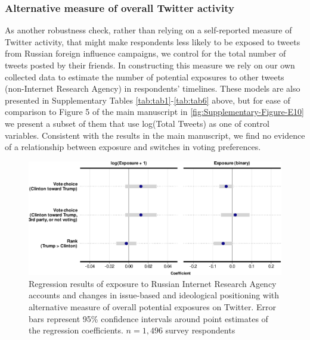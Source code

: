 \documentclass[
  12pt,
]{article}
\begin{document}
\clearpage

\hypertarget{alternative-measure-of-overall-twitter-activity}{%
\subsubsection{Alternative measure of overall Twitter activity}\label{alternative-measure-of-overall-twitter-activity}}

As another robustness check, rather than relying on a self-reported measure of Twitter activity, that might make respondents less likely to be exposed to tweets from Russian foreign influence campaigns, we control for the total number of tweets posted by their friends. In constructing this measure we rely on our own collected data to estimate the number of potential exposures to other tweets (non-Internet Research Agency) in respondents' timelines. These models are also presented in Supplementary Tables \ref{tab:tab1}-\ref{tab:tab6} above, but for ease of comparison to Figure 5 of the main manuscript in \autoref{fig:Supplementary-Figure-E10} we present a subset of them that use log(Total Tweets) as one of control variables. Consistent with the results in the main manuscript, we find no evidence of a relationship between exposure and switches in voting preferences.

\begin{figure}
\centering
\includegraphics{Supplementary_Information_files/figure-latex/Supplementary-Figure-E10-1.pdf}
\caption{\label{fig:Supplementary-Figure-E10}Regression results of exposure to Russian Internet Research Agency accounts and changes in issue-based and ideological positioning with alternative measure of overall potential exposures on Twitter. Error bars represent 95\% confidence intervals around point estimates of the regression coefficients. \(n = 1,496\) survey respondents}
\end{figure}

\clearpage
\end{document}
